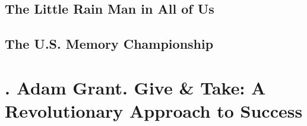 \documentclass[oneside]{book}
\numberwithin{equation}{section}
\begin{document}
\section{The Little Rain Man in All of Us}


\section{The U.S. Memory Championship}


\chapter{\cite{Grant2013, Grant2022}. Adam Grant. Give \& Take: A Revolutionary Approach to Success}
\end{document}
